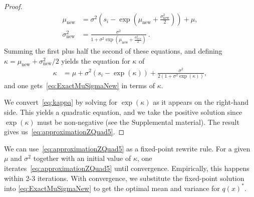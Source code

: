 \documentclass[runningheads,a4paper]{llncs}
\begin{document}
\begin{proof}
%
{\small
\begin{align}
    \mu_{\text{new}} & = \sigma^{2}\left(s_i - \exp\left(\mu_{\text{new}}+\frac{\sigma_{\text{new}}^2}{2}\right)\right) + \mu, \nonumber \\
   \sigma_{\text{new}}^2 & = \frac{\sigma^2}{1+\sigma^2 \exp(\mu_{\text{new}}+\frac{\sigma_{new}^2}{2})}~.\nonumber
\end{align}}
Summing the first plus half the second of these equations,
and defining $\kappa=\mu_{\text{new}}+\sigma_{\text{new}}^2/2$
yields the equation for $\kappa$ of
{\small
\begin{align}\label{eq:kappa}
    \kappa & = \mu + \sigma^2(s_i - \exp(\kappa)) + \frac{\sigma^2}{2(1+\sigma^2\exp(\kappa))},
\end{align}}
and one gets~\eqref{eq:ExactMuSigmaNew} in terms of $\kappa$.

We convert~\eqref{eq:kappa} by solving for $\exp(\kappa)$
as it appears on the right-hand side.  This yields
a quadratic equation, and we take the positive solution since $\exp(\kappa)$
must be non-negative (see the Supplemental material).
The result gives us~\eqref{eq:approximationZQuad5}.
\end{proof}

We can use~\eqref{eq:approximationZQuad5}
as a fixed-point rewrite rule.
For a given $\mu$ and $\sigma^2$ together with an initial value of
$\kappa$, one iterates~\eqref{eq:approximationZQuad5} until
convergence.  Empirically, this happens within 2-3 iterations.
With convergence, we substitute the fixed-point solution
into \eqref{eq:ExactMuSigmaNew} to get the optimal mean
and variance for $q(x)^*$.


\end{document}
